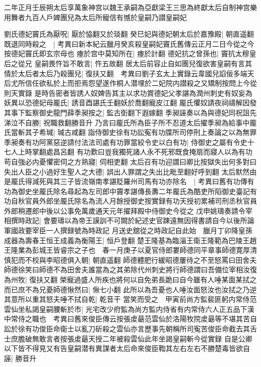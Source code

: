 二年正月壬辰朔太后享萬象神宫以魏王承嗣為亞獻梁王三思為終獻太后自制神宫樂用舞者九百人戶婢團兒為太后所寵信有憾於皇嗣乃譛皇嗣妃

劉氏德妃竇氏為厭呪|{
	厭於恊翻又於琰翻}
癸巳妃與德妃朝太后於嘉豫殿|{
	朝直遥翻}
既退同時殺之　|{
	考異曰新本紀云臘月癸亥殺皇嗣妃竇氏舊傳云正月二日今從之今按德妃竇氏即玄宗母也}
瘞於宫中莫知所在|{
	瘞於計翻}
德妃抗之曾孫也|{
	竇抗太穆皇后之從兄}
皇嗣畏忤旨不敢言|{
	忤五故翻}
居太后前容止自如團兒復欲害皇嗣有言其情於太后者太后乃殺團兒|{
	復扶又翻　考異曰劉子玄太上實錄云韋國兒諂佞多端天后尤所信任欲私於上而拒焉怨望遂作桐人潜埋於二妃院内譛殺之又矯制按問上今從則天實錄}
是時告密者皆誘人奴婢告其主以求功賞德妃父孝諶為潤州刺史有奴妄為妖異以恐德妃母龎氏|{
	誘音酉諶氏壬翻妖於喬翻寵皮江翻}
龎氏懼奴請夜祠禱解因發其事下監察御史龍門薛季昶按之|{
	監古衘翻下遐嫁翻}
季昶誣奏以為與德妃同祝詛先涕泣不自勝|{
	祝職救翻勝音升}
乃言曰龎氏所為臣子所不忍道太后擢季昶為給事中龎氏當斬其子希瑊|{
	瑊古咸翻}
詣侍御史徐有功訟寃有功牒所司停刑上奏論之以為無罪季昶奏有功阿黨惡逆請付法法司處有功罪當絞令史以白有功|{
	侍御史之屬有令史十七人上時掌翻處昌呂翻}
有功歎曰豈我獨死諸人永不死邪既食掩扇而寢人以為有功苟自強必内憂懼密伺之方熟寢|{
	伺相吏翻}
太后召有功迎謂曰卿比按獄失出何多對曰失出人臣之小過好生聖人之大德|{
	誤出人罪謂之失出比毗至翻好呼到翻}
太后默然由是龎氏得減死與其三子皆流嶺南孝諶貶羅州司馬有功亦除名　|{
	考異曰舊有功傳有功為御史坐龎氏除名尋起為左司郎中竇孝諶傳長夀二年龎氏為酷吏所䧟御史臺記有功自秋官員外郎坐龎氏除名為流人月餘授御史按實録有功天授初累補司刑丞秋官員外郎稍遷郎中後以公事免萬歲通天元年擢拜殿中侍御史今從之}
戊申姚璹奏請令宰相撰時政記|{
	會要璹以為帝王謨訓不可闕於紀述史官踈遠無因得書請自今以後所論軍國政要宰臣一人撰録號為時政記}
月送史舘從之時政記自此始　臘月丁卯降皇孫成器為壽春王恒王成義為衡陽王|{
	恒戶登翻}
楚王隆基為臨淄王衛王隆範為巴陵王趙王隆業為彭城王皆睿宗之子也　春一月庚子以夏官侍郎婁師德同平章事師德寛厚清慎犯而不校與李昭德俱入朝|{
	朝直遥翻}
師德體肥行緩昭德屢待之不至怒罵曰田舍夫師德徐笑曰師德不為田舍夫誰當為之其弟除代州刺史將行師德謂曰吾備位宰相汝復為州牧|{
	復扶又翻}
榮寵過盛人所疾也將何以自免弟長跪曰自今雖有人唾某面某拭之而已庶不為兄憂師德愀然曰|{
	愀七小翻}
此所以為吾憂也人唾汝面怒汝也汝拭之乃逆其意所以重其怒夫唾不拭自乾|{
	乾音干}
當笑而受之　甲寅前尚方監裴匪躬内常侍范雲仙坐私謁皇嗣腰斬於市|{
	光宅改少府監為尚方監内侍省有内常侍六人正五品下漢中常侍之職也　考異曰舊來俊臣傳云按張䖍朂范雲仙於洛陽牧院䖍朂等不堪其苦自訟於徐有功俊臣命衛士以亂刀斫殺之雲仙亦言歷事先朝稱所司寃苦俊臣命截去其舌士庶膽破無敢言者按張䖍朂天授二年被殺雲仙此年坐謁皇嗣斬今從實録}
自是公卿以下皆不得見又有告皇嗣潜有異謀者太后命來俊臣鞫其左右左右不勝楚毒皆欲自誣|{
	勝音升}
